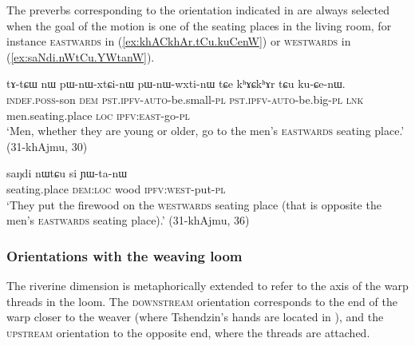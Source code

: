 The preverbs corresponding to the orientation indicated in  are always selected when the goal of the motion is one of the seating places in the living room, for instance \textsc{eastwards} in (\ref{ex:khACkhAr.tCu.kuCenW}) or \textsc{westwards} in (\ref{ex:saNdi.nWtCu.YWtanW}).

\begin{exe}
\ex \label{ex:khACkhAr.tCu.kuCenW}
\gll tɤ-tɕɯ nɯ pɯ-nɯ-xtɕi-nɯ pɯ-nɯ-wxti-nɯ tɕe kʰɤɕkʰɤr tɕu ku-ɕe-nɯ. \\
\textsc{indef}.\textsc{poss}-son \textsc{dem} \textsc{pst}.\textsc{ipfv}-\textsc{auto}-be.small-\textsc{pl} \textsc{pst}.\textsc{ipfv}-\textsc{auto}-be.big-\textsc{pl} \textsc{lnk} men.seating.place \textsc{loc} \textsc{ipfv}:\textsc{east}-go-\textsc{pl} \\
\glt `Men, whether they are young or older, go to the men's \textsc{eastwards} seating place.' (31-khAjmu, 30)
\end{exe}

\begin{exe}
\ex \label{ex:saNdi.nWtCu.YWtanW}
\gll  saŋdi nɯtɕu si ɲɯ-ta-nɯ \\
seating.place \textsc{dem}:\textsc{loc} wood \textsc{ipfv}:\textsc{west}-put-\textsc{pl} \\
\glt `They put the firewood on the \textsc{westwards} seating place (that is opposite the men's \textsc{eastwards} seating place).' (31-khAjmu, 36)
\end{exe}




\subsubsection{Orientations with the weaving loom} \label{sec:orientation.loom}
The riverine dimension is metaphorically extended to refer to the axis of the warp threads in the loom. The \textsc{downstream} orientation corresponds to the end of the warp closer to the weaver (where Tshendzin's hands are located in ), and the \textsc{upstream} orientation to the opposite end, where the threads are attached.

